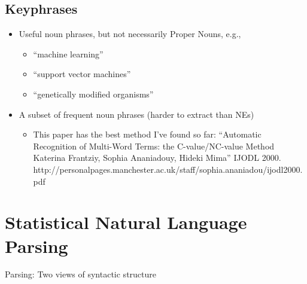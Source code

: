 \documentclass[11pt]{article}
\theoremstyle{definition}
\begin{document}
\subsection{Keyphrases}
\begin{itemize}
  \item Useful noun phrases, but not necessarily Proper Nouns, e.g.,
  \begin{itemize}
    \item “machine learning”
    \item “support vector machines”
    \item “genetically modified organisms”
  \end{itemize}
  \item A subset of frequent noun phrases (harder to extract than NEs)
  \begin{itemize}
    \item This paper has the best method I’ve found so far:
    “Automatic Recognition of Multi-Word Terms: the C-value/NC-value Method
    Katerina Frantziy, Sophia Ananiadouy, Hideki Mima” IJODL 2000.
    http://personalpages.manchester.ac.uk/staff/sophia.ananiadou/ijodl2000.pdf
  \end{itemize}
\end{itemize}

\section{Statistical Natural
Language Parsing}
Parsing: Two views of
syntactic structure
\end{document}
